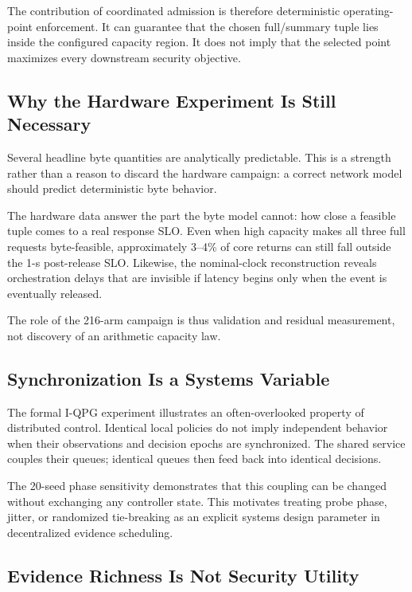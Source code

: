 \documentclass[10pt,journal]{IEEEtran}
\newcommand{\IQPG}{\textsc{I-QPG}}
\begin{document}
The contribution of coordinated admission is therefore deterministic
operating-point enforcement. It can guarantee that the chosen
full/summary tuple lies inside the configured capacity region. It does
not imply that the selected point maximizes every downstream security
objective.

\subsection{Why the Hardware Experiment Is Still Necessary}

Several headline byte quantities are analytically predictable. This is
a strength rather than a reason to discard the hardware campaign:
a correct network model should predict deterministic byte behavior.

The hardware data answer the part the byte model cannot:
how close a feasible tuple comes to a real response SLO. Even when
high capacity makes all three full requests byte-feasible, approximately
3--4\% of core returns can still fall outside the 1-s post-release SLO.
Likewise, the nominal-clock reconstruction reveals orchestration delays
that are invisible if latency begins only when the event is eventually
released.

The role of the 216-arm campaign is thus validation and residual
measurement, not discovery of an arithmetic capacity law.

\subsection{Synchronization Is a Systems Variable}

The formal \IQPG{} experiment illustrates an often-overlooked property
of distributed control. Identical local policies do not imply independent
behavior when their observations and decision epochs are synchronized.
The shared service couples their queues; identical queues then feed back
into identical decisions.

The 20-seed phase sensitivity demonstrates that this coupling can be
changed without exchanging any controller state. This motivates treating
probe phase, jitter, or randomized tie-breaking as an explicit systems
design parameter in decentralized evidence scheduling.

\subsection{Evidence Richness Is Not Security Utility}
\end{document}
